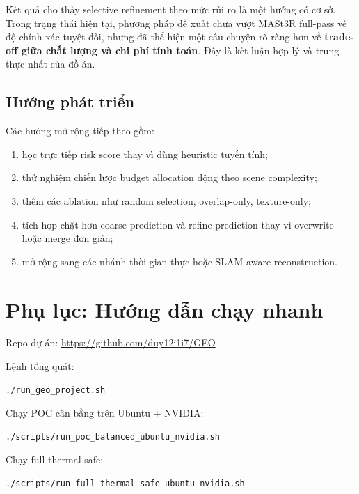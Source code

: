 \documentclass[12pt,a4paper,oneside]{report}
\begin{document}
Kết quả cho thấy selective refinement theo mức rủi ro là một hướng có cơ sở. Trong trạng thái hiện tại, phương pháp đề xuất chưa vượt MASt3R full-pass về độ chính xác tuyệt đối, nhưng đã thể hiện một câu chuyện rõ ràng hơn về \textbf{trade-off giữa chất lượng và chi phí tính toán}. Đây là kết luận hợp lý và trung thực nhất của đồ án.

\section{Hướng phát triển}

Các hướng mở rộng tiếp theo gồm:
\begin{enumerate}[leftmargin=1.5em]
  \item học trực tiếp risk score thay vì dùng heuristic tuyến tính;
  \item thử nghiệm chiến lược budget allocation động theo scene complexity;
  \item thêm các ablation như random selection, overlap-only, texture-only;
  \item tích hợp chặt hơn coarse prediction và refine prediction thay vì overwrite hoặc merge đơn giản;
  \item mở rộng sang các nhánh thời gian thực hoặc SLAM-aware reconstruction.
\end{enumerate}

\appendix
\chapter{Phụ lục: Hướng dẫn chạy nhanh}

Repo dự án: \url{https://github.com/duy12i1i7/GEO}

Lệnh tổng quát:
\begin{verbatim}
./run_geo_project.sh
\end{verbatim}

Chạy POC cân bằng trên Ubuntu + NVIDIA:
\begin{verbatim}
./scripts/run_poc_balanced_ubuntu_nvidia.sh
\end{verbatim}

Chạy full thermal-safe:
\begin{verbatim}
./scripts/run_full_thermal_safe_ubuntu_nvidia.sh
\end{verbatim}



\end{document}
